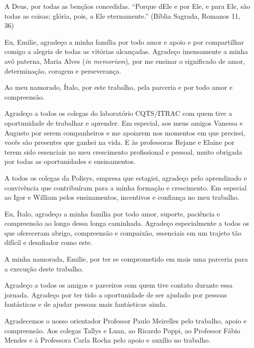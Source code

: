\begin{agradecimentos}

A Deus, por todas as bençãos concedidas. ``Porque dEle e por Ele, e para Ele, são todas as coisas; glória, pois, a Ele eternamente.''
(Bíblia Sagrada, Romanos 11, 36)

Eu, Emilie, agradeço a minha família por todo amor e apoio e por compartilhar comigo a alegria de todas as vitórias alcançadas. 
Agradeço imensamente a minha avó paterna, Maria Alves (\textit{in memoriam}), por me ensinar o significado de amor, determinação, 
coragem e perseverança. 

Ao meu namorado, Ítalo, por este trabalho, pela parceria e por todo amor e compreensão.

Agradeço a todos os colegas do laboratório CQTS/ITRAC com quem tive a oportunidade de trabalhar e aprender. Em especial, aos meus amigos 
Vanessa e Augusto por serem companheiros e me apoiarem nos momentos em que precisei, vocês são presentes que ganhei 
na vida. E às professoras Rejane e Elaine por terem sido essenciais no meu crescimento profissional e pessoal, muito obrigada por  
todas as oportunidades e ensinamentos.

A todos os colegas da Polisys, empresa que estagiei, agradeço pelo aprendizado e convivência que contribuíram para a
minha formação e crescimento. Em especial ao Igor e William pelos ensinamentos, incentivos e confiança no meu trabalho.

Eu, Ítalo, agradeço a minha família por todo amor, suporte, paciência e compreensão ao longo dessa longa caminhada.
Agradeço especialmente a todos os que ofereceram abrigo, compreensão e compaixão, essenciais em um trajeto 
tão difícil e desafiador como este.

A minha namorada, Emilie, por ter se comprometido em mais uma parceria para a execução deste trabalho.

Agradeço a todos os amigos e parceiros com quem tive contato durante essa jornada.
Agradeço por ter tido a oportunidade de ser ajudado por pessoas fantásticas e de ajudar pessoas mais fantásticas ainda.

Agradecemos o nosso orientador Professor Paulo Meirelles pelo trabalho, apoio e compreensão. Aos colegas Tallys e Luan, 
ao Ricardo Poppi, ao Professor Fábio Mendes e à Professora Carla Rocha pelo apoio e auxílio no trabalho.


\end{agradecimentos}
